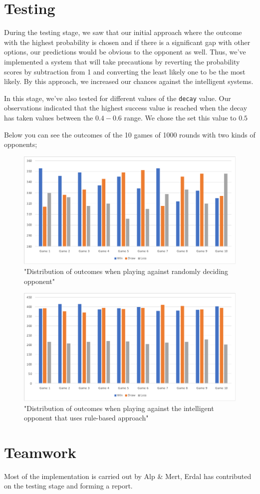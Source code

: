\documentclass{IEEEtran}
\begin{document}
	
	\section{Testing}
		During the testing stage, we saw that our initial approach where the outcome with the highest probability is chosen and if there is a significant gap with other options, our predictions would be obvious to the opponent as well. Thus, we've implemented a system that will take precautions by reverting the probability scores by subtraction from 1 and converting the least likely one to be the most likely. By this approach, we increased our chances against the intelligent systems.
		
		In this stage, we've also tested for different values of the \texttt{decay} value. Our observations indicated that the highest success value is reached when the decay has taken values between the $0.4-0.6$ range. We chose the set this value to $0.5$
		
		Below you can see the outcomes of the 10 games of 1000 rounds with two kinds of opponents;
		
			\begin{figure}[h!]
				\centering
				\includegraphics[scale=0.4]{fully-random.pdf}
				\caption{"Distribution of outcomes when playing against randomly deciding opponent"}\label{fand}
			\end{figure}


			\begin{figure}[h!]
				\centering
				\includegraphics[scale=0.4]{rule-based.pdf}
				\caption{"Distribution of outcomes when playing against the intelligent opponent that uses rule-based approach"}\label{fand}
			\end{figure}


		\pagebreak

	\section{Teamwork}
	
	Most of the implementation is carried out by Alp \& Mert, Erdal has contributed on the testing stage and forming a report. 

	
	
	
\end{document}

